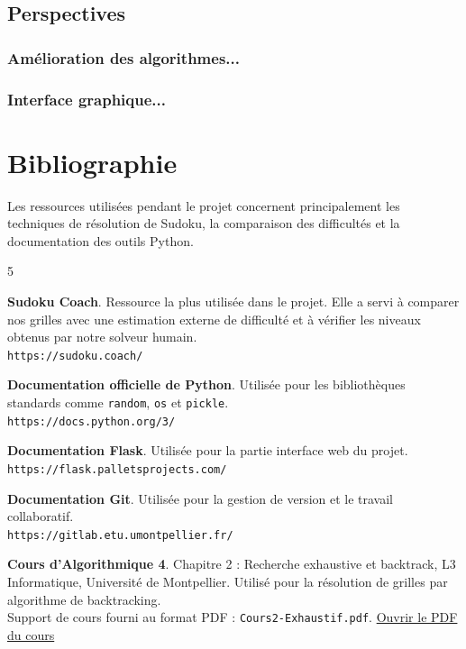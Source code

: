\documentclass[a4paper]{article}
\begin{document}
\subsection{Perspectives}

\subsubsection{Amélioration des algorithmes...}
\subsubsection{Interface graphique...}

\vspace{0.5cm}

\section{Bibliographie}

Les ressources utilisées pendant le projet concernent principalement les techniques de résolution de Sudoku, la comparaison des difficultés et la documentation des outils Python.

\begin{thebibliography}{5}

\textbf{Sudoku Coach}. 
Ressource la plus utilisée dans le projet. 
Elle a servi à comparer nos grilles avec une estimation externe de difficulté et à vérifier les niveaux obtenus par notre solveur humain.\\
\texttt{https://sudoku.coach/}

\textbf{Documentation officielle de Python}. 
Utilisée pour les bibliothèques standards comme \texttt{random}, \texttt{os} et \texttt{pickle}.\\
\texttt{https://docs.python.org/3/}

\textbf{Documentation Flask}. 
Utilisée pour la partie interface web du projet.\\
\texttt{https://flask.palletsprojects.com/}

\textbf{Documentation Git}. 
Utilisée pour la gestion de version et le travail collaboratif.\\
\texttt{https://gitlab.etu.umontpellier.fr/}

\textbf{Cours d'Algorithmique 4}. 
Chapitre 2 : Recherche exhaustive et backtrack, L3 Informatique, Université de Montpellier. 
Utilisé pour la résolution de grilles par algorithme de backtracking.\\
Support de cours fourni au format PDF : \texttt{Cours2-Exhaustif.pdf}.
\href{run:Cours2-Exhaustif.pdf}{Ouvrir le PDF du cours}


\end{thebibliography}
\end{document}
